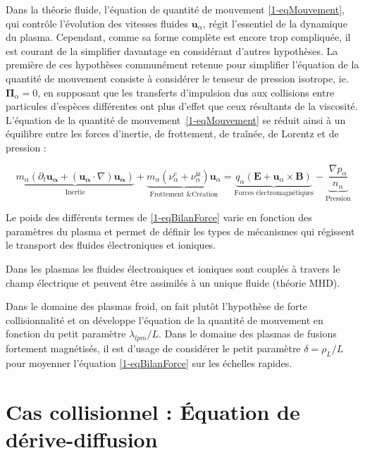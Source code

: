\begin{refsection}
Dans la théorie fluide, l'équation de quantité de
mouvement \eqref{1-eqMouvement}, qui contrôle l'évolution des vitesses fluides
$\mathbf u_\alpha$, régit l'essentiel de la dynamique du plasma. Cependant, comme sa forme complète
 est encore trop compliquée, il est courant de la
simplifier davantage en considérant d'autres hypothèses.
La première de ces hypothèses communément retenue pour simplifier l'équation de
la quantité de mouvement consiste à considérer le tenseur de pression isotrope,
ie.
$\boldsymbol{\Pi}_\alpha=0$, en supposant que les transferts d'impulsion dus
aux collisions entre particules d'espèces différentes ont plus d'effet que
ceux résultants de la viscosité. L'équation de la quantité de
mouvement~\eqref{1-eqMouvement} se réduit ainsi à un équilibre entre les forces
d'inertie, de frottement, de traînée, de Lorentz et de pression :

\begin{equation}
\label{1-eqBilanForce}
\underbrace{m_\alpha \left(\partial_t \mathbf{u_\alpha} +
(\mathbf{u_\alpha}\cdot\nabla)\mathbf{u_\alpha}\right)}_\text{Inertie}
+\underbrace{m_\alpha\left(\nu_\alpha^c+
\nu_\alpha^\text{iz}\right)\mathbf
u_\alpha}_\text{Frottement \& Création}=\underbrace{{q_\alpha}\left(\mathbf
E+\mathbf u_\alpha\times \mathbf B\right)}_\text{Forces électromagnétiques}
-\underbrace{\frac{\nabla p_\alpha}{n_\alpha}}_\text{Pression}
\end{equation}
 
Le poids des différents termes de \eqref{1-eqBilanForce} varie en fonction des
paramètres du plasma et permet de définir les types de mécanismes qui régissent
le transport des fluides électroniques et ioniques.



Dans les plasmas les fluides électroniques et ioniques sont couplés à
travers le champ électrique et peuvent être assimilés à un unique fluide
(théorie MHD). 

Dans le domaine des plasmas
froid, on fait plutôt l'hypothèse de forte collisionnalité et on développe
l'équation de la quantité de mouvement en fonction du petit paramètre
$\lambda_{lpm}/L$.
Dans le domaine des plasmas de fusions fortement magnétisés, il est d'usage de
considérer le petit paramètre $\delta=\rho_L/L$ pour moyenner l'équation
\eqref{1-eqBilanForce} sur les échelles rapides. 

\section{Cas collisionnel : Équation de dérive-diffusion}
\label{1-transportAmbipolaire}

\end{refsection}
